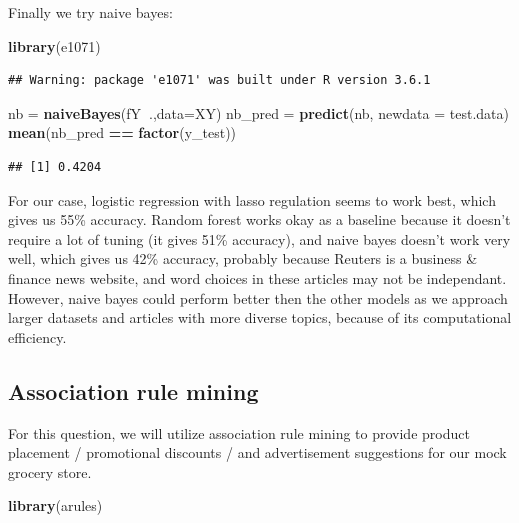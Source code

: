 \documentclass[]{article}
\newenvironment{Shaded}{\begin{snugshade}}{\end{snugshade}}
\newcommand{\DataTypeTok}[1]{\textcolor[rgb]{0.13,0.29,0.53}{#1}}
\newcommand{\KeywordTok}[1]{\textcolor[rgb]{0.13,0.29,0.53}{\textbf{#1}}}
\newcommand{\NormalTok}[1]{#1}
\newcommand{\OperatorTok}[1]{\textcolor[rgb]{0.81,0.36,0.00}{\textbf{#1}}}
\newcommand{\StringTok}[1]{\textcolor[rgb]{0.31,0.60,0.02}{#1}}
\begin{document}
Finally we try naive bayes:

\begin{Shaded}
\begin{Highlighting}[]
\KeywordTok{library}\NormalTok{(e1071)}
\end{Highlighting}
\end{Shaded}

\begin{verbatim}
## Warning: package 'e1071' was built under R version 3.6.1
\end{verbatim}

\begin{Shaded}
\begin{Highlighting}[]
\NormalTok{nb =}\StringTok{ }\KeywordTok{naiveBayes}\NormalTok{(fY}\OperatorTok{~}\NormalTok{.,}\DataTypeTok{data=}\NormalTok{XY)}
\NormalTok{nb_pred =}\StringTok{ }\KeywordTok{predict}\NormalTok{(nb, }\DataTypeTok{newdata =}\NormalTok{ test.data)}
\KeywordTok{mean}\NormalTok{(nb_pred }\OperatorTok{==}\StringTok{ }\KeywordTok{factor}\NormalTok{(y_test))}
\end{Highlighting}
\end{Shaded}

\begin{verbatim}
## [1] 0.4204
\end{verbatim}

For our case, logistic regression with lasso regulation seems to work
best, which gives us 55\% accuracy. Random forest works okay as a
baseline because it doesn't require a lot of tuning (it gives 51\%
accuracy), and naive bayes doesn't work very well, which gives us 42\%
accuracy, probably because Reuters is a business \& finance news
website, and word choices in these articles may not be independant.
However, naive bayes could perform better then the other models as we
approach larger datasets and articles with more diverse topics, because
of its computational efficiency.

\hypertarget{association-rule-mining}{%
\subsection{Association rule mining}\label{association-rule-mining}}

For this question, we will utilize association rule mining to provide
product placement / promotional discounts / and advertisement
suggestions for our mock grocery store.

\begin{Shaded}
\begin{Highlighting}[]
\KeywordTok{library}\NormalTok{(arules)}
\end{Highlighting}
\end{Shaded}
\end{document}
